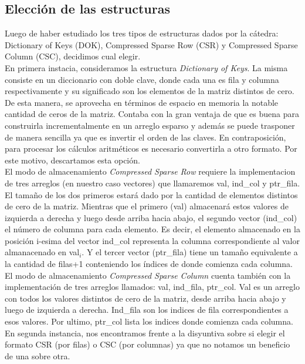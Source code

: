 \documentclass[a4paper]{article}
\begin{document}
\subsection{Elecci\'on de las estructuras}
\indent Luego de haber estudiado los tres tipos de estructuras dados por la c\'atedra: Dictionary of Keys (DOK), Compressed Sparse Row (CSR) y Compressed Sparse Column (CSC), decidimos cual elegir. \\
\indent En primera instacia, consideramos la estructura \textit{Dictionary of Keys}. La misma consiste en un diccionario con doble clave, donde cada una es fila y columna respectivamente y su significado son los elementos de la matriz distintos de cero. De esta manera, se aprovecha en t\'erminos de espacio en memoria la notable cantidad de ceros de la matriz. Contaba con la gran ventaja de que es buena para construirla incrementalmente en un arreglo esparso y adem\'as se puede trasponer de manera sencilla ya que es invertir el orden de las claves. En contraposici\'on, para procesar los c\'alculos aritm\'eticos es necesario convertirla a otro formato. Por este motivo, descartamos esta opci\'on. \\
\indent El modo de almacenamiento \textit{Compressed Sparse Row} requiere la implementacion de tres arreglos (en nuestro caso vectores) que llamaremos val, ind_col y ptr_fila. El tamaño de los dos primeros estar\'a dado por la cantidad de elementos distintos de cero de la matriz. Mientras que el primero (val) almacenar\'a estos valores de izquierda a derecha y luego desde arriba hacia abajo, el segundo vector (ind_col) el n\'umero de columna para cada elemento. Es decir, el elemento almacenado en la posición i-esima del vector ind_col representa la columna correspondiente al valor almanacenado en val$_i$. Y el tercer vector (ptr_fila) tiene un tama\~no equivalente a la cantidad de filas+1 conteniendo los \'indices de donde comienza cada columna.\\
\indent El modo de almacenamiento \textit{Compressed Sparse Column} cuenta tambi\'en con la implementaci\'on de tres arreglos llamados: val, ind_fila, ptr_col. Val es un arreglo con todos los valores distintos de cero de la matriz, desde arriba hacia abajo y luego de izquierda a derecha. Ind_fila son los indices de fila correspondientes a esos valores.  Por ultimo, ptr_col lista los indices donde comienza cada columna.\\
\indent En segunda instancia, nos encontramos frente a la disyuntiva sobre si elegir el formato CSR (por filas) o CSC (por columnas) ya que no notamos un beneficio de una sobre otra. \\
\end{document}
